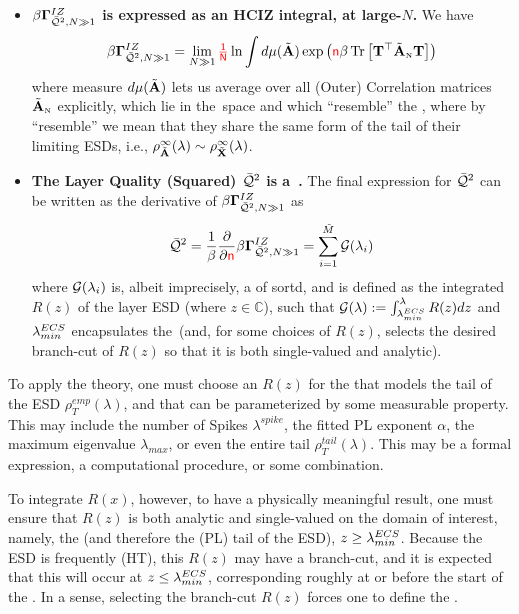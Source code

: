 \begin{itemize}
  \item
  \textbf{$\beta\mathbf{\Gamma}^{IZ}_{\bar{\mathcal{Q}}^{2},N\gg 1}$ is expressed as an HCIZ integral, at large-$N$.}
  We have
  \begin{align}
  \label{eqn:IZGINF_HCIZ}
  \IZGINF = \lim_{N\gg 1}\red{\tfrac{1}{N}}\ln\int d\mu(\AECS)\exp\left(\ND\beta\Trace{\mathbf{T}^{\TR}\AECSN\mathbf{T}}\right) %
  \end{align}
  where  measure $d\mu(\tilde{\mathbf{A}})$ lets us average over all (Outer) \Student Correlation matrices $\tilde{\mathbf{A}}_{\text{\tiny N}}$ explicitly, which
  lie in the~\ECS space and which ``resemble'' the \Teacher, 
  where by ``resemble'' we mean that they share the same form of the tail of
  their limiting ESDs,
  i.e., $\rho^{\infty}_{\tilde{\mathbf{A}}}(\lambda)\sim\rho^{\infty}_{\tilde{\mathbf{X}}}(\lambda)$.
  \item
  \textbf{The Layer Quality (Squared) $\bar{\mathcal{Q}}^{2}$ is a~\GEN.}
  The final expression for $\bar{\mathcal{Q}}^{2}$ can be written as the derivative of $\beta\mathbf{\Gamma}^{IZ}_{\bar{\mathcal{Q}}^{2},N\gg 1}$  as
  \begin{align}
    \label{eqn:QT_result}
    \bar{\mathcal{Q}}^{2} = \dfrac{1}{\beta}\dfrac{\partial}{\partial {\color{red}\sf{n}}}\beta\mathbf{\Gamma}^{IZ}_{\bar{\mathcal{Q}}^{2},N\gg 1} = \sum_{i=1}^{\tilde{M}}\mathcal{G}(\lambda_{i})
  \end{align}
  where $\mathcal{G}(\lambda_{i})$ is, albeit imprecisely, a \emph{\GEN} of sortd, and is  defined as the integrated \emph{\RTransform} $R(z)$ of the \Teacher
  layer ESD (where $z\in\mathbb{C}$), such that $\mathcal{G(\lambda)}:= \int_{\lambda^{ECS}_{min}}^{\lambda}R(z)dz$
  and $\lambda^{ECS}_{min}$  encapsulates  the~\ECS (and, for some choices of $R(z)$,  selects the desired branch-cut of $R(z)$
  so that it is both single-valued and analytic).
\end{itemize}

To apply the theory, one must choose an \RTransform $R(z)$ for	the \Teacher that models 
the tail of the ESD $\rho^{emp}_{T}(\lambda)$, and that can be
parameterized by some measurable property.
This may include the number of Spikes $\lambda^{spike}$, the fitted PL exponent $\alpha$,
the maximum eigenvalue $\lambda_{max}$, or even the entire tail $\rho^{tail}_{T}(\lambda)$.
This may be a formal expression, a computational procedure, or some combination.

To integrate $R(x)$, however, to have a physically meaningful result,
one must ensure that $R(z)$ is both
analytic and single-valued on the domain of interest, namely, the \ECS (and therefore
the (PL) tail of the ESD),  $z \ge \lambda^{ECS}_{min}$.
Because the ESD is frequently \HeavyTailed (HT), this
\RTransform $R(z)$ may have a branch-cut, and it is expected that this will occur
at $z\le \lambda^{ECS}_{min}$, corresponding roughly at or before the start of the \ECS.
In a sense, selecting the branch-cut $R(z)$ forces one to define the \ECS.

